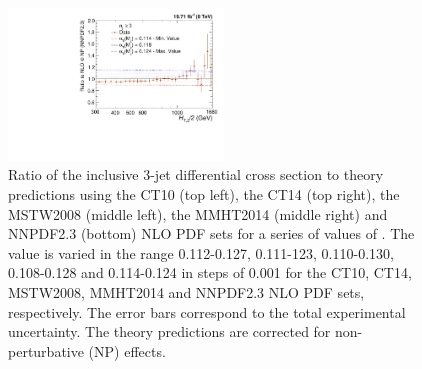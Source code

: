 \begin{figure}[!htbp]
\begin{center}
 \vspace*{3mm}
 \includegraphics[width=0.51\textwidth]{Plots_HT_2_150/Sensitivity_3_ratio_NLO_NNPDF23.pdf}
 \caption{Ratio of the inclusive 3-jet differential cross section to theory predictions using the CT10 (top left), the CT14 (top right), the MSTW2008 (middle left), the MMHT2014 (middle right) and NNPDF2.3 (bottom) NLO PDF sets for a series of values of \alpsmz. The \alpsmz value is varied in the range 0.112-0.127, 0.111-123, 0.110-0.130, 0.108-0.128 and 0.114-0.124 in steps of 0.001 for the CT10, CT14, MSTW2008, MMHT2014 and NNPDF2.3 NLO PDF sets, respectively. The error bars correspond to the total experimental uncertainty. The theory predictions are corrected for non-perturbative (NP) effects.}
 \label{fig:sensitivity_3}
 \end{center}
\end{figure}

